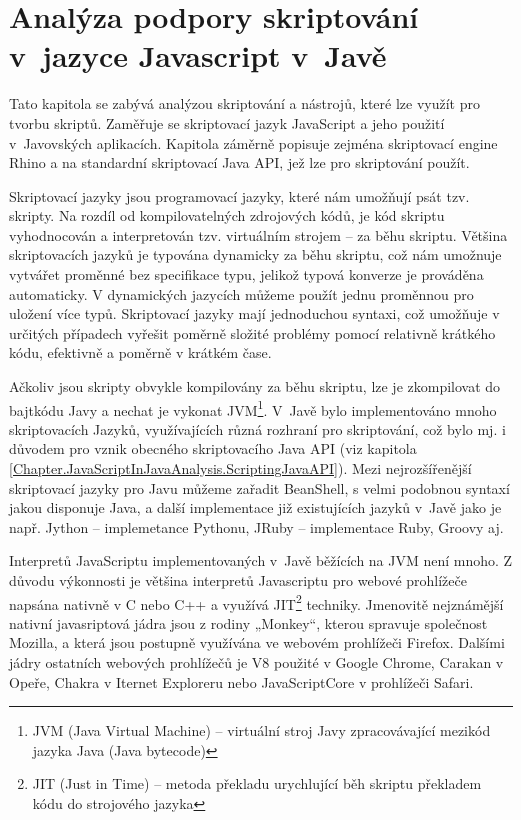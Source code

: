 \chapter{Analýza podpory skriptování v~jazyce Javascript v~Javě}
\label{Chapter.JavaScriptInJavaAnalysis}

Tato kapitola se zabývá analýzou skriptování a nástrojů, které lze využít pro tvorbu skriptů. Zaměřuje se skriptovací jazyk JavaScript a jeho použití v~Javovských aplikacích. Kapitola záměrně popisuje zejména skriptovací engine Rhino a na standardní skriptovací Java API, jež lze pro skriptování použít.

Skriptovací jazyky jsou programovací jazyky, které nám umožňují psát tzv. skripty. Na rozdíl od kompilovatelných zdrojových kódů, je kód skriptu vyhodnocován a interpretován tzv. virtuálním strojem -- za běhu skriptu. Většina skriptovacích jazyků je typována dynamicky za běhu skriptu, což nám umožnuje vytvářet proměnné bez specifikace typu, jelikož typová konverze je prováděna automaticky. V dynamických jazycích můžeme použít jednu proměnnou pro uložení více typů. Skriptovací jazyky mají jednoduchou syntaxi, což umožňuje v určitých případech vyřešit poměrně složité problémy pomocí relativně krátkého kódu, efektivně a poměrně v krátkém čase.

Ačkoliv jsou skripty obvykle kompilovány za běhu skriptu, lze je zkompilovat do bajtkódu Javy a nechat je vykonat JVM\footnote{JVM  (Java Virtual Machine) -- virtuální stroj Javy zpracovávající mezikód jazyka Java (Java bytecode)}. V~Javě bylo implementováno mnoho skriptovacích Jazyků, využívajících různá rozhraní pro skriptování, což bylo mj. i důvodem pro vznik obecného skriptovacího Java API (viz kapitola \ref{Chapter.JavaScriptInJavaAnalysis.ScriptingJavaAPI}). Mezi nejrozšířenější skriptovací jazyky pro Javu můžeme zařadit BeanShell, s velmi podobnou syntaxí jakou disponuje Java, a další implementace již existujících jazyků v~Javě jako je např. Jython -- implemetance Pythonu,  JRuby -- implementace Ruby, Groovy aj.

Interpretů JavaScriptu implementovaných v~Javě běžících na JVM není mnoho. Z důvodu výkonnosti je většina interpretů Javascriptu pro webové prohlížeče napsána nativně v C nebo C++ a využívá JIT\footnote{JIT (Just in Time) -- metoda překladu urychlující běh skriptu překladem kódu do strojového jazyka} techniky. Jmenovitě nejznámější nativní javasriptová jádra jsou z rodiny „Monkey“, kterou spravuje společnost Mozilla, a která jsou postupně využívána ve webovém prohlížeči Firefox. Dalšími jádry ostatních webových prohlížečů je V8 použité v Google Chrome, Carakan v Opeře, Chakra v Iternet Exploreru nebo JavaScriptCore v prohlížeči Safari.

